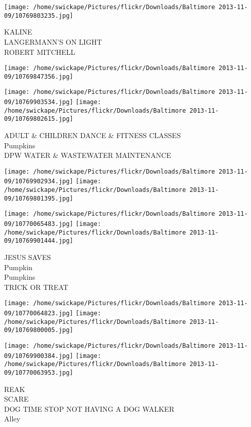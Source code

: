 \documentclass[10pt,letterpaper]{article}
\begin{document}
\texttt{[image: /home/swickape/Pictures/flickr/Downloads/Baltimore 2013-11-09/10769803235.jpg]}

KALINE\\
LANGERMANN'S ON LIGHT\\
ROBERT MITCHELL\\
\pagebreak

\texttt{[image: /home/swickape/Pictures/flickr/Downloads/Baltimore 2013-11-09/10769847356.jpg]}

\vspace{0.25in}
\texttt{[image: /home/swickape/Pictures/flickr/Downloads/Baltimore 2013-11-09/10769903534.jpg]}
\texttt{[image: /home/swickape/Pictures/flickr/Downloads/Baltimore 2013-11-09/10769802615.jpg]}

ADULT \& CHILDREN DANCE \& FITNESS CLASSES\\
Pumpkins\\
DPW WATER \& WASTEWATER MAINTENANCE\\
\pagebreak

\texttt{[image: /home/swickape/Pictures/flickr/Downloads/Baltimore 2013-11-09/10769902934.jpg]}
\texttt{[image: /home/swickape/Pictures/flickr/Downloads/Baltimore 2013-11-09/10769801395.jpg]}

\texttt{[image: /home/swickape/Pictures/flickr/Downloads/Baltimore 2013-11-09/10770065483.jpg]}
\texttt{[image: /home/swickape/Pictures/flickr/Downloads/Baltimore 2013-11-09/10769901444.jpg]}

JESUS SAVES\\
Pumpkin\\
Pumpkins\\
TRICK OR TREAT\\
\pagebreak

\texttt{[image: /home/swickape/Pictures/flickr/Downloads/Baltimore 2013-11-09/10770064823.jpg]}
\texttt{[image: /home/swickape/Pictures/flickr/Downloads/Baltimore 2013-11-09/10769800005.jpg]}

\texttt{[image: /home/swickape/Pictures/flickr/Downloads/Baltimore 2013-11-09/10769900384.jpg]}
\texttt{[image: /home/swickape/Pictures/flickr/Downloads/Baltimore 2013-11-09/10770063953.jpg]}

REAK\\
SCARE\\
DOG TIME STOP NOT HAVING A DOG WALKER\\
Alley\\
\pagebreak
\end{document}
